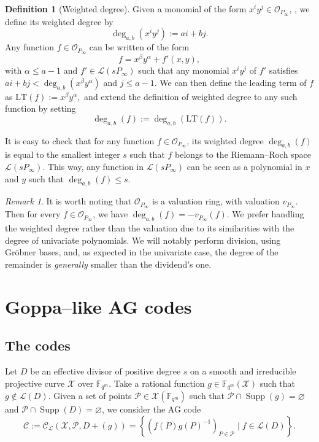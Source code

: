 \documentclass[a4paper]{article}
\theoremstyle{definition}
\newtheorem{definition}[thm]{Definition}
\theoremstyle{remark}
\newtheorem{remark}[thm]{Remark}
\newcommand{\calP}{\mathcal{P}}
\newcommand{\calL}{\mathcal{L}}
\newcommand{\calC}{\mathcal{C}}
\newcommand{\calO}{\mathcal{O}}
\newcommand{\calX}{\mathcal{X}}
\newcommand{\fqm}{\mathbb{F}_{q^m}}
\newcommand{\set}[1]{\left\{#1\right\}}
\newcommand{\Supp}{\operatorname{Supp}}
\newcommand{\degab}[1]{\deg_{a,b}\left(#1\right)}
\begin{document}
\begin{definition}[Weighted degree]
Given a monomial of the form $x^iy^j \in \calO_{P_\infty}$, , we define its weighted degree by
\[ \degab{x^iy^j} := ai+bj.\]
%
Any function $f \in \calO_{P_\infty}$ can be written of the form $$f = x^{\beta}y^{\alpha} + f'(x,y),$$
with $\alpha \leq a-1$ and $f' \in \calL(sP_{\infty})$ such that any monomial $x^iy^j$ of $f'$ satisfies $ai+bj < \degab{x^{\beta}y^{\alpha}}$ and $j \leq a-1$. We can then define the leading term of $f$ as $\mathrm{LT}(f) := x^{\beta}y^{\alpha},$ and extend the definition of weighted degree to any such function by setting 
\[\degab{f} := \degab{\mathrm{LT}(f)}.\]
\end{definition}

It is easy to check that for any function $f \in \calO_{P_\infty}$, its weighted degree $\degab{f}$ is equal to the smallest integer $s$ such that $f$ belongs to the Riemann--Roch space $\calL(sP_{\infty})$.
%
This way, any function in $\calL(sP_\infty)$ can be seen as a polynomial in $x$ and $y$ such that $\degab{f}\leq s$. 

\begin{remark}
It is worth noting that $\calO_{P_\infty}$ is a valuation ring, with valuation $v_{P_\infty}$. Then for every $f \in \calO_{P_\infty}$, we have $\degab{f}=-v_{P_\infty}(f)$. We prefer handling the weighted degree rather than the valuation due to its similarities with the degree of univariate 
polynomials. We will notably perform division, using Gr\"obner bases, and, as expected in the univariate case, the degree of the remainder is 
\textit{generally} smaller than the dividend's one.
\end{remark}

\section{Goppa--like AG codes}

\subsection{The codes}

Let $D$ be an effective divisor of positive degree $s$ on a smooth and irreducible projective curve $\calX$ over $\fqm$. Take a rational function $g \in \fqm(\calX)$ such that $g \notin \calL(D)$. Given a set of points $\calP \in \calX(\fqm)$ such that $\calP \cap \Supp(g) = \varnothing$ and $\calP \cap \Supp(D) = \varnothing$, we consider the AG code
\[\calC := \calC_{\calL}(\calX,\calP,D+(g))=\set{\left(f(P)g(P)^{-1}\right)_{P \in \calP} \mid f \in \calL(D)}.\]
\end{document}

